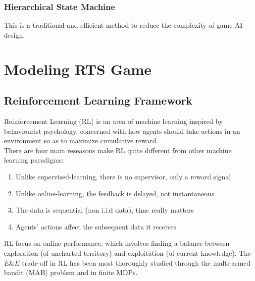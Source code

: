 \documentclass{llncs}
\begin{document}
\subsubsection{Hierarchical State Machine}
This is a traditional and efficient method to reduce the complexity of game AI design.

\section{Modeling RTS Game}
\subsection{Reinforcement Learning Framework}
Reinforcement Learning (RL) is an area of machine learning inspired by behaviourist psychology, concerned with how agents should take actions in an environment so as to maximize cumulative reward.\\
There are four main reseasons make RL quite different from other machine learning paradigms\cite{David_Silver:intro_RL}:
\begin{enumerate}
\item Unlike supervised-learning, there is no supervisor, only a reward signal
\item Unlike online-learning, the feedback is delayed, not instantaneous
\item The data is sequential (non i.i.d data), time really matters
\item Agents' actions affect the subsequent data it receives
\end{enumerate}
RL focus on online performance, which involves finding a balance between exploration (of uncharted territory) and exploitation (of current knowledge). The $E\&E$ trade-off in RL has been most thoroughly studied through the multi-armed bandit (MAB) problem and in finite MDPs.
\end{document}
